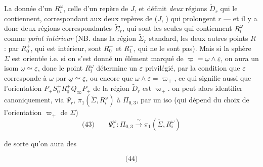 \documentclass[11pt,a4paper]{article}
\begin{document}
La donnée d'un $R_i^{\omega}$,  celle d'un repère  de $J$, et définit \emph{deux}  régions $\widetilde{D}_r$ qui le contiennent, correspondant aux deux repères de ($J$, \uncertain{$\underline{\varepsilon}$}) qui prolongent $r$ — et il y a donc deux régions correspondantes $\widetilde{\Sigma}_r$, qui sont les seules qui contiennent $R_i^{\omega}$ comme \emph{point intérieur} (NB. dans la région $\widetilde{\Sigma}_r$ standard, les deux autres points $R$ : par $R_0^+$, qui est intérieur, sont $R_0^-$ et $R_1^-$, qui ne le sont pas). Mais si la sphère $\Sigma$ est orientée i.e. si on s'est donné un élément marqué \add{$\varpi_+$} de $\underline{\varpi} = \underline{\omega} \wedge \underline{\varepsilon}$, on aura un isom $\underline{\omega} \simeq \underline{\varepsilon}$, donc le point $R_i^{\omega}$ détermine un $\varepsilon$ \add{$\in \underline{\varepsilon}$} privilégié, par la condition que $\varepsilon$ corresponde à $\omega$ par $\underline{\omega} \simeq \underline{\varepsilon}$, ou encore que $\omega \wedge \varepsilon = \varpi_+$, ce qui signifie aussi que l'orientation $P_+S_0^+R_0^+Q_\infty P_+$ de la région \struck{$\widetilde{\Sigma}$} $\widetilde{D}_r$ est \struck{\ill{}} $\varpi_+$.  on peut alors identifier canoniquement, via $\Psi_r$, $\pi_1(\widetilde{\Sigma},R_i^{\omega})$ à $\Pi_{0,3}$, par un iso (qui dépend du choix de l'orientation $\varpi_+$ de $\Sigma$)
\[
\text{(43)}\qquad \Psi_i^{\omega} : \Pi_{0,3} \xrightarrow{\ \sim\ } \pi_1(\widetilde{\Sigma},R_i^{\omega})
\]

de sorte qu'on aura   des

\[\text{(44)}\]


\end{document}
